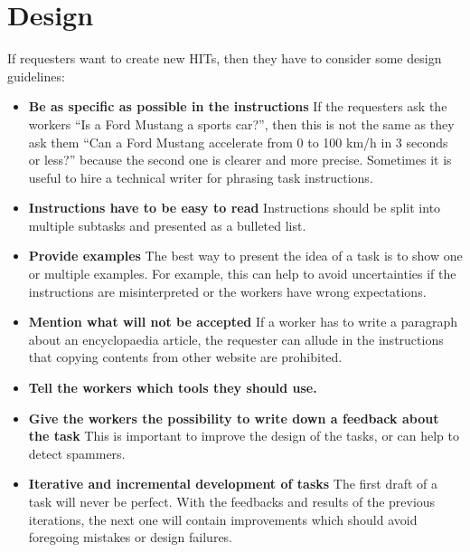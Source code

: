 \section{Design}
If requesters want to create new HITs, then they have to consider some design guidelines\cite{crowdsourcing_tutorial,mturk_bestpractices}: 
\begin{itemize}
\item \textbf{Be as specific as possible in the instructions} If the requesters ask the workers ``Is a Ford Mustang a sports car?'', then this is not the same as they ask them ``Can a Ford Mustang accelerate from 0 to 100 km/h in 3 seconds or less?'' because the second one is clearer and more precise. Sometimes it is useful to hire a technical writer for phrasing task instructions. 
\item \textbf{Instructions have to be easy to read} Instructions should be split into multiple subtasks and presented as a bulleted list. 
\item \textbf{Provide examples} The best way to present the idea of a task is to show one or multiple examples. For example, this can help to avoid uncertainties if the instructions are misinterpreted or the workers have wrong expectations. 
\item \textbf{Mention what will not be accepted} If a worker has to write a paragraph about an encyclopaedia article, the requester can allude in the instructions that copying contents from other website are prohibited.
\item \textbf{Tell the workers which tools they should use.} 
\item \textbf{Give the workers the possibility to write down a feedback about the task} This is important to improve the design of the tasks, or can help to detect spammers. 
\item \textbf{Iterative and incremental development of tasks} The first draft of a task will never be perfect. With the feedbacks and results of the previous iterations, the next one will contain improvements which should avoid foregoing mistakes or design failures.
\end{itemize}

